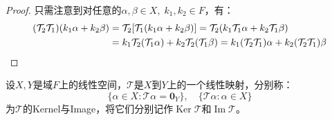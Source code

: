 \begin{proof}
	只需注意到对任意的$\alpha,\beta\in X,\;k_1,k_2\in F$，有：
	\begin{align*}
		(\mathcal{T}_2\mathcal{T}_1)(k_1\alpha+k_2\beta)
		&=\mathcal{T}_2[\mathcal{T}_1(k_1\alpha+k_2\beta)]
		=\mathcal{T}_2(k_1\mathcal{T}_1\alpha+k_2\mathcal{T}_1\beta) \\
		&=k_1\mathcal{T}_2(\mathcal{T}_1\alpha)+k_2\mathcal{T}_2(\mathcal{T}_1\beta)
		=k_1(\mathcal{T}_2\mathcal{T}_1)\alpha+k_2(\mathcal{T}_2\mathcal{T}_1)\beta\qedhere
	\end{align*}
\end{proof}
\begin{definition}
	设$X,Y$是域$F$上的线性空间，$\mathcal{T}$是$X$到$Y$上的一个线性映射，分别称：
	\begin{equation*}
		\{\alpha\in X:\mathcal{T}\alpha=\mathbf{0}_Y\},\quad
		\{\mathcal{T}\alpha:\alpha\in X\}
	\end{equation*}
	为$\mathcal{T}$的\gls{Kernel}与\gls{Image}，将它们分别记作$\operatorname{Ker}\mathcal{T}$和$\operatorname{Im}\mathcal{T}$。
\end{definition}
